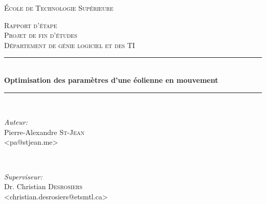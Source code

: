 \documentclass[11pt]{article}
\begin{document}
\pagestyle{fancy}

\begin{titlepage}
\thispagestyle{fancy}

\newcommand{\HRule}{\rule{\linewidth}{0.5mm}} %

\center %
 

\textsc{\LARGE École de Technologie Supérieure}\\[1.5cm] %

\vfill

\textsc{\Large Rapport d'étape}\\[0.5cm] %
\textsc{\large Projet de fin d'études \\ Département de génie logiciel et des TI}\\[0.5cm] %



\HRule \\[0.4cm]
{ \huge \bfseries Optimisation des paramètres d’une éolienne en mouvement}\\[0.4cm] %
\HRule \\[1.5cm]
 

\begin{minipage}{0.4\textwidth}
\begin{flushleft} \large
\emph{Auteur:}\\
Pierre-Alexandre \textsc{St-Jean}\\
\small{<pa@stjean.me>}
\end{flushleft}
\end{minipage}
~
\begin{minipage}{0.4\textwidth}
\begin{flushright} \large
\emph{Superviseur:} \\
Dr. Christian \textsc{Desrosiers}\\
\small{<christian.desrosiers@etsmtl.ca>}
\end{flushright}
\end{minipage}\\[4cm]


\end{titlepage}
\end{document}
